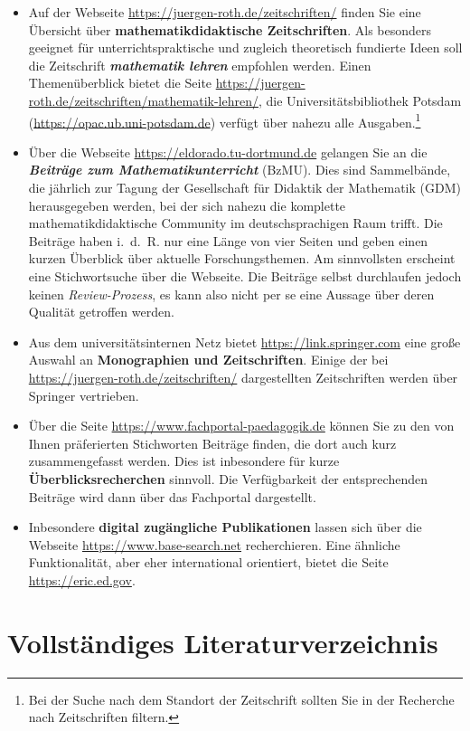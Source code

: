 \documentclass[
]{scrbook}
\theoremstyle{definition}
\theoremstyle{definition}
\theoremstyle{definition}
\theoremstyle{definition}
\theoremstyle{remark}
\begin{document}
\begin{itemize}
\item
  Auf der Webseite \url{https://juergen-roth.de/zeitschriften/} finden Sie eine Übersicht über \textbf{mathematikdidaktische Zeitschriften}. Als besonders geeignet für unterrichtspraktische und zugleich theoretisch fundierte Ideen soll die Zeitschrift \textbf{\emph{mathematik lehren}} empfohlen werden. Einen Themenüberblick bietet die Seite \url{https://juergen-roth.de/zeitschriften/mathematik-lehren/}, die Universitätsbibliothek Potsdam (\url{https://opac.ub.uni-potsdam.de}) verfügt über nahezu alle Ausgaben.\footnote{Bei der Suche nach dem Standort der Zeitschrift sollten Sie in der Recherche nach Zeitschriften filtern.}
\item
  Über die Webseite \url{https://eldorado.tu-dortmund.de} gelangen Sie an die \textbf{\emph{Beiträge zum Mathematikunterricht}} (BzMU). Dies sind Sammelbände, die jährlich zur Tagung der Gesellschaft für Didaktik der Mathematik (GDM) herausgegeben werden, bei der sich nahezu die komplette mathematikdidaktische Community im deutschsprachigen Raum trifft. Die Beiträge haben i.~d.~R. nur eine Länge von vier Seiten und geben einen kurzen Überblick über aktuelle Forschungsthemen. Am sinnvollsten erscheint eine Stichwortsuche über die Webseite. Die Beiträge selbst durchlaufen jedoch keinen \emph{Review-Prozess}, es kann also nicht per se eine Aussage über deren Qualität getroffen werden.
\item
  Aus dem universitätsinternen Netz bietet \url{https://link.springer.com} eine große Auswahl an \textbf{Monographien und Zeitschriften}. Einige der bei \url{https://juergen-roth.de/zeitschriften/} dargestellten Zeitschriften werden über Springer vertrieben.
\item
  Über die Seite \url{https://www.fachportal-paedagogik.de} können Sie zu den von Ihnen präferierten Stichworten Beiträge finden, die dort auch kurz zusammengefasst werden. Dies ist inbesondere für kurze \textbf{Überblicksrecherchen} sinnvoll. Die Verfügbarkeit der entsprechenden Beiträge wird dann über das Fachportal dargestellt.
\item
  Inbesondere \textbf{digital zugängliche Publikationen} lassen sich über die Webseite \url{https://www.base-search.net} recherchieren. Eine ähnliche Funktionalität, aber eher international orientiert, bietet die Seite \url{https://eric.ed.gov}.
\end{itemize}

\hypertarget{vollstuxe4ndiges-literaturverzeichnis}{%
\chapter{Vollständiges Literaturverzeichnis}\label{vollstuxe4ndiges-literaturverzeichnis}}
\end{document}
